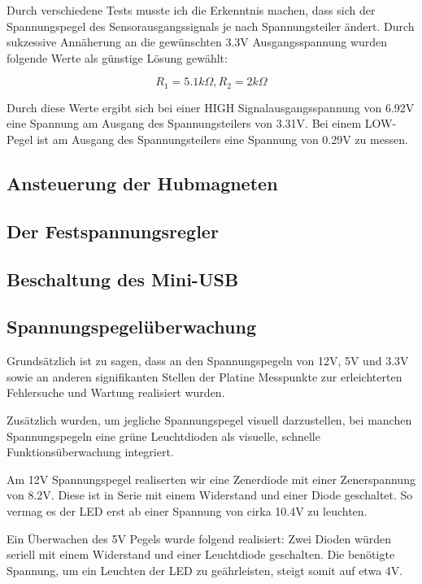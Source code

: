 Durch verschiedene Tests musste ich die Erkenntnis machen, dass sich der Spannungspegel des Sensorausgangssignals je nach Spannungsteiler ändert.
Durch sukzessive Annäherung an die gewünschten 3.3V Ausgangsspannung wurden folgende Werte als günstige Lösung gewählt:

\begin{equation*}
    R_1 = 5.1k\Omega, R_2 = 2k\Omega
\end{equation*}

Durch diese Werte ergibt sich bei einer HIGH Signalausgangsspannung von 6.92V eine Spannung am Ausgang des Spannungsteilers von 3.31V.
Bei einem LOW-Pegel ist am Ausgang des Spannungsteilers eine Spannung von 0.29V zu messen.


\subsection{Ansteuerung der Hubmagneten}

\subsection{Der Festspannungsregler}

\subsection{Beschaltung des Mini-USB}

\subsection{Spannungspegelüberwachung}

Grundsätzlich ist zu sagen, dass an den Spannungspegeln von 12V, 5V und 3.3V sowie an anderen signifikanten Stellen der Platine Messpunkte zur erleichterten Fehlersuche und Wartung realisiert wurden.

Zusätzlich wurden, um jegliche Spannungspegel visuell darzustellen, bei manchen Spannungspegeln eine grüne Leuchtdioden als visuelle, schnelle Funktionsüberwachung integriert.

Am 12V Spannungspegel realiserten wir eine Zenerdiode mit einer Zenerspannung von 8.2V.
Diese ist in Serie mit einem Widerstand und einer Diode geschaltet.
So vermag es der LED erst ab einer Spannung von cirka 10.4V zu leuchten.

Ein Überwachen des 5V Pegels wurde folgend realisiert:
Zwei Dioden würden seriell mit einem Widerstand und einer Leuchtdiode geschalten.
Die benötigte Spannung, um ein Leuchten der LED zu geährleisten, steigt somit auf etwa 4V.

